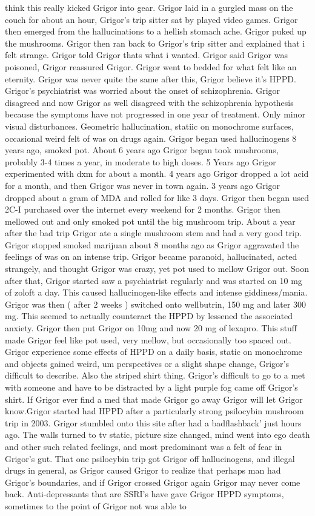 \documentclass[12pt]{book}
\begin{document}
think this really kicked Grigor into gear. Grigor laid in a gurgled mass on the couch for about an hour, Grigor's trip sitter sat by played video games. Grigor then emerged from the hallucinations to a hellish stomach ache. Grigor puked up the mushrooms. Grigor then ran back to Grigor's trip sitter and explained that i felt strange. Grigor told Grigor thats what i wanted. Grigor said Grigor was poisoned, Grigor reassured Grigor. Grigor went to bedded for what felt like an eternity. Grigor was never quite the same after this, Grigor believe it's HPPD. Grigor's psychiatrist was worried about the onset of schizophrenia. Grigor disagreed and now Grigor as well disagreed with the schizophrenia hypothesis because the symptoms have not progressed in one year of treatment. Only minor visual disturbances. Geometric hallucination, statiic on monochrome surfaces, occasional weird felt of was on drugs again. Grigor began used hallucinogens 8 years ago, smoked pot. About 6 years ago Grigor began took mushrooms, probably 3-4 times a year, in moderate to high doses. 5 Years ago Grigor experimented with dxm for about a month. 4 years ago Grigor dropped a lot acid for a month, and then Grigor was never in town again. 3 years ago Grigor dropped about a gram of MDA and rolled for like 3 days. Grigor then began used 2C-I purchased over the internet every weekend for 2 months. Grigor then mellowed out and only smoked pot until the big mushroom trip. About a year after the bad trip Grigor ate a single mushroom stem and had a very good trip. Grigor stopped smoked marijuan about 8 months ago as Grigor aggravated the feelings of was on an intense trip. Grigor became paranoid, hallucinated, acted strangely, and thought Grigor was crazy, yet pot used to mellow Grigor out. Soon after that, Grigor started saw a psychiatrist regularly and was started on 10 mg of zoloft a day. This caused hallucinogen-like effects and intense giddiness/mania. Grigor was then ( after 2 weeks ) switched onto wellbutrin, 150 mg and later 300 mg. This seemed to actually counteract the HPPD by lessened the associated anxiety. Grigor then put Grigor on 10mg and now 20 mg of lexapro. This stuff made Grigor feel like pot used, very mellow, but occasionally too spaced out. Grigor experience some effects of HPPD on a daily basis, static on monochrome and objects gained weird, um perspectives or a slight shape change, Grigor's difficult to describe. Also the striped shirt thing. Grigor's difficult to go to a met with someone and have to be distracted by a light purple fog came off Grigor's shirt. If Grigor ever find a med that made Grigor go away Grigor will let Grigor know.Grigor started had HPPD after a particularly strong psilocybin mushroom trip in 2003. Grigor stumbled onto this site after had a badflashback' just hours ago. The walls turned to tv static, picture size changed, mind went into ego death and other such related feelings, and most predominant was a felt of fear in Grigor's gut. That one psilocybin trip got Grigor off hallucinogens, and illegal drugs in general, as Grigor caused Grigor to realize that perhaps man had Grigor's boundaries, and if Grigor crossed Grigor again Grigor may never come back. Anti-depressants that are SSRI's have gave Grigor HPPD symptoms, sometimes to the point of Grigor not was able to 
\end{document}
